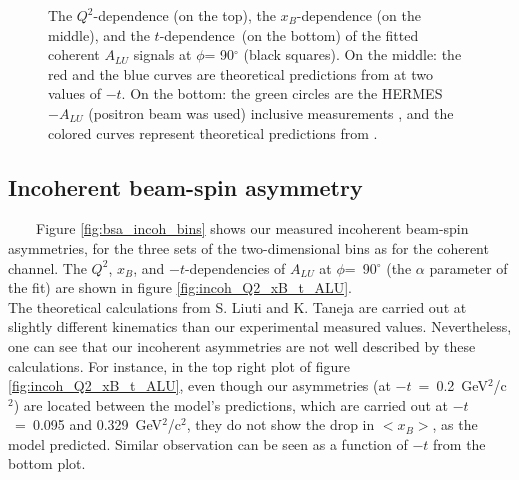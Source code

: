 \begin{figure}[tpb]
\caption{The $Q^{2}$-dependence (on the top), the $x_{B}$-dependence (on the 
   middle), and the $t$-dependence~(on the bottom) of the fitted coherent 
   $A_{LU}$ signals at $\phi$= 90$^{\circ}$ (black squares). On the middle: the red and the 
   blue curves are theoretical predictions from \cite{simonetta_2} at two 
values of $-t$. On the bottom: the green circles are the HERMES $-A_{LU}$ 
(positron beam was used) inclusive measurements \cite{HERMES_BSA}, and the 
colored curves represent theoretical predictions from \cite{simonetta_2}.} 
\label{fig:coh_Q2_xB_t_ALU}
\end{figure}


\subsection{Incoherent beam-spin asymmetry}
~~~~Figure \ref{fig:bsa_incoh_bins} shows our measured incoherent beam-spin 
asymmetries, for the three sets of the two-dimensional bins as for the coherent 
channel. The $Q^2$, $x_{B}$, and $-t$-dependencies of $A_{LU}$ at 
$\phi$=~90$^{\circ}$ (the $\alpha$ parameter of the fit) are shown in figure 
\ref{fig:incoh_Q2_xB_t_ALU}.\\

The theoretical calculations from S. Liuti and K. Taneja are carried out at 
slightly different kinematics than our experimental measured values.  
Nevertheless, one can see that our incoherent asymmetries are not well 
described by these calculations. For instance, in the top right plot of figure 
\ref{fig:incoh_Q2_xB_t_ALU}, even though our asymmetries (at 
$-t$~=~0.2~GeV$^2$/c$^2$) are located between the model's predictions, which 
are carried out at $-t$~=~0.095 and 0.329~GeV$^2$/c$^2$, they do not show the 
drop in $<x_B>$, as the model predicted. Similar observation can be seen as a 
function of $-t$ from the bottom plot.

